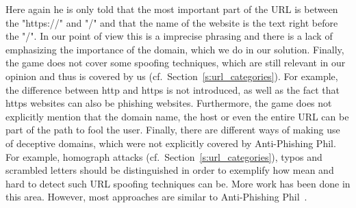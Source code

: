 Here again he is only told that the most important part of the URL is between the "https://" and "/" and that the name of the website is the text right before the "/". 
In our point of view this is a imprecise phrasing and there is a lack of emphasizing the importance of the domain, which we do in our solution. 
Finally, the game does not cover some spoofing techniques, which are still relevant in our opinion and thus is covered by us (cf.~Section~\autoref{s:url_categories}). 
For example, the difference between http and https is not introduced, as well as the fact that https websites can also be phishing websites. 
Furthermore, the game does not explicitly mention that the domain name, the host or even the entire URL can be part of the path to fool the user. 
Finally, there are different ways of making use of deceptive domains, which were not explicitly covered by Anti-Phishing Phil. 
For example, homograph attacks (cf.~Section~\autoref{s:url_categories}), typos and scrambled letters should be distinguished in order to exemplify how mean and hard to detect such URL spoofing techniques can be. \newline
More work has been done in this area. However, most approaches are similar to Anti-Phishing Phil~\cite{arachchilage2011designing,arachchilage2012designing}.

